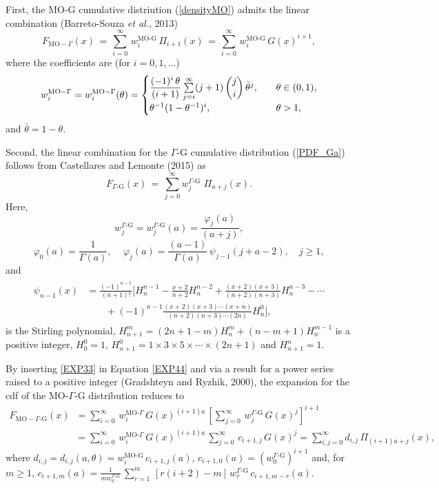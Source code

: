 \documentclass[12pt,a4paper]{article} %
\begin{document}
First, the MO-G cumulative distriution (\ref{densityMO}) admits the
linear combination (Barreto-Souza \emph{et al.}, 2013)
\begin{equation}
F_{\text{MO}-\Gamma}(x)
\,=\,
\sum^{\infty}_{i=0}\,w_i^{\text{MO-G}}\,\Pi_{i+1}(x)\,=\,\sum^{\infty}_{i=0}\,w_i^{\text{MO-G}}\,G(x)^{i+1},
\label{EXP44}
\end{equation}
where the coefficients are (for $i=0,1,\ldots$)
\[
w_i^{\text{MO}-\Gamma}=w_i^{\text{MO}-\Gamma}(\theta) =
\begin{cases}
\dfrac{(-1)^i\,\theta}{(i+1)} \sum\limits^{\infty}_{j=i}(j+1)\,\dbinom{j}{i}\,\bar{\theta}^j,& \quad \theta\in (0,1),\\
\theta^{-1} (1-\theta^{-1})^i,& \quad \theta>1,
\end{cases}
\]
and $\bar{\theta}=1-\theta$.


Second, the linear combination for the $\Gamma\text{-G}$ cumulative distribution (\ref{PDF_Ga}) follows from Castellares and Lemonte (2015) as
\begin{equation}\label{EXP33}
F_{\Gamma\text{-G}}(x)\,=\,\sum_{j=0}^\infty w_{j}^{\Gamma\text{-G}}\,\,\Pi_{a+j}(x).
\end{equation}
Here,
$$w_j^{\Gamma\text{-G}}=w_j^{\Gamma\text{-G}}(a)=\frac{\varphi_{j}(a)}{(a+j)},$$
\begin{equation*}\label{coeficientes}
\varphi_0(a)=\frac{1}{\Gamma(a)},
\quad\,
\varphi_j(a)=\frac{(a-1)}{\Gamma(a)}\,\psi_{j-1}(j+a-2),\quad j\geq 1,
\end{equation*}
and
\begin{align*}\label{polinomios_ward}
\begin{split}
\psi_{n-1}(x)&=\frac{(-1)^{n-1}}{(n+1)!}\Biggl[H^{n-1}_{n}-\frac{x+2}{n+2}H^{n-2}_{n}
+ \frac{(x+2)(x+3)}{(n+2)(n+3)}H^{n-3}_{n}- \cdots\\
&\qquad+ (-1)^{n-1}\frac{(x+2)(x+3)\cdots(x+n)}{(n+2)(n+3)\cdots(2n)}H^{0}_{n}\Biggr],
\end{split}
\end{align*}
is the Stirling polynomial, $H^{m}_{n+1}=(2n+1-m)H^{m}_{n} + (n-m+1)H^{m-1}_{n}$ is a positive integer,
$H^0_0=1$, $H^{0}_{n+1}=1\times 3\times 5\times\cdots\times(2n+1)$ and $H^{n}_{n+1}=1$.

By inserting \eqref{EXP33} in Equation \eqref{EXP44} and via a result for a power series raised to a positive integer (Gradshteyn and
Ryzhik, 2000), the expansion for the cdf of the MO-$\Gamma$-G distribution reduces to
\begin{align*}
F_{\text{MO}-\Gamma\text{-G}}(x)&=\sum_{i=0}^{\infty}\,w_{i}^{\text{MO-}\Gamma}\,G(x)^{(i+1)a}\,\left[\sum_{j=0}^{\infty}\,w_{j}^{\Gamma\text{-G}}\,G(x)^{j}\right]^{i+1}\\
&=\sum_{i=0}^{\infty}\,w_{i}^{\text{MO-}\Gamma}\,G(x)^{(i+1)a}\,\sum_{j=0}^{\infty}\,c_{i+1,j}\,G(x)^{j} =\sum_{i,j=0}^\infty d_{i,j}\,\Pi_{(i+1)a+j}(x),
\end{align*}
where $d_{i,j}=d_{i,j}(a,\theta)=w_{i}^{\text{MO-G}}\,c_{i+1,j}(a)$, $c_{i+1,0}(a)=(w_{0}^{\Gamma\text{-G}})^{i+1}$ and, for $m \ge 1$,
$c_{i+1,m}(a)=\frac{1}{m w_{0}^{\Gamma\text{-G}}}\,\sum^{m}_{r=1}\,\left[r(i+2)-m\right]\,w_{r}^{\Gamma\text{-G}}\,c_{i+1,m-r}(a)$.
\end{document}
